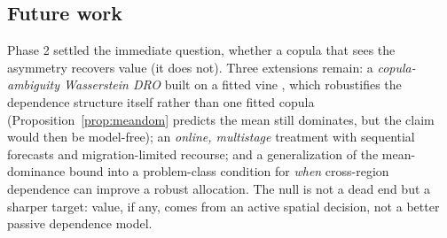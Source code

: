 \documentclass[12pt]{article}
\begin{document}
\subsection{Future work}
Phase 2 settled the immediate question, whether a copula that sees the asymmetry recovers
value (it does not). Three extensions remain: a \emph{copula-ambiguity Wasserstein DRO}
\citep{fan2024} built on a fitted vine \citep{aas2009,dissmann2013}, which robustifies the
dependence structure itself rather than one fitted copula (Proposition~\ref{prop:meandom}
predicts the mean still dominates, but the claim would then be model-free); an \emph{online,
multistage} treatment with sequential forecasts and migration-limited recourse; and
a generalization of the mean-dominance bound into a problem-class condition for \emph{when}
cross-region dependence can improve a robust allocation. The null is not a dead end but a
sharper target: value, if any, comes from an active spatial decision, not a better passive
dependence model.
\end{document}
